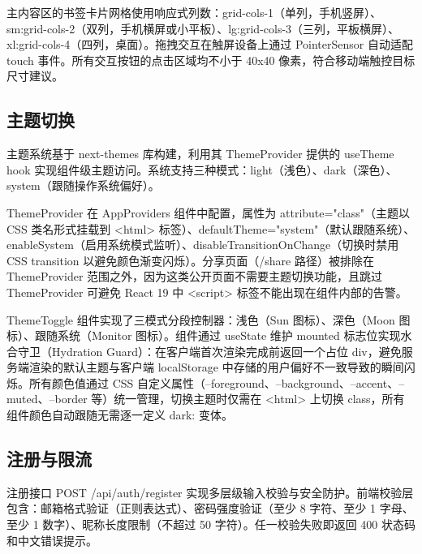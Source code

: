 \documentclass[a4paper,12pt]{ctexart}
\begin{document}
主内容区的书签卡片网格使用响应式列数：grid-cols-1（单列，手机竖屏）、sm:grid-cols-2（双列，手机横屏或小平板）、lg:grid-cols-3（三列，平板横屏）、xl:grid-cols-4（四列，桌面）。拖拽交互在触屏设备上通过 PointerSensor 自动适配 touch 事件。所有交互按钮的点击区域均不小于 40x40 像素，符合移动端触控目标尺寸建议。


\subsection{主题切换}

主题系统基于 next-themes 库构建，利用其 ThemeProvider 提供的 useTheme hook 实现组件级主题访问。系统支持三种模式：light（浅色）、dark（深色）、system（跟随操作系统偏好）。

ThemeProvider 在 AppProviders 组件中配置，属性为 attribute="class"（主题以 CSS 类名形式挂载到 <html> 标签）、defaultTheme="system"（默认跟随系统）、enableSystem（启用系统模式监听）、disableTransitionOnChange（切换时禁用 CSS transition 以避免颜色渐变闪烁）。分享页面（/share 路径）被排除在 ThemeProvider 范围之外，因为这类公开页面不需要主题切换功能，且跳过 ThemeProvider 可避免 React 19 中 <script> 标签不能出现在组件内部的告警。

ThemeToggle 组件实现了三模式分段控制器：浅色（Sun 图标）、深色（Moon 图标）、跟随系统（Monitor 图标）。组件通过 useState 维护 mounted 标志位实现水合守卫（Hydration Guard）：在客户端首次渲染完成前返回一个占位 div，避免服务端渲染的默认主题与客户端 localStorage 中存储的用户偏好不一致导致的瞬间闪烁。所有颜色值通过 CSS 自定义属性（--foreground、--background、--accent、--muted、--border 等）统一管理，切换主题时仅需在 <html> 上切换 class，所有组件颜色自动跟随无需逐一定义 dark: 变体。


\subsection{注册与限流}

注册接口 POST /api/auth/register 实现多层级输入校验与安全防护。前端校验层包含：邮箱格式验证（正则表达式）、密码强度验证（至少 8 字符、至少 1 字母、至少 1 数字）、昵称长度限制（不超过 50 字符）。任一校验失败即返回 400 状态码和中文错误提示。
\end{document}
